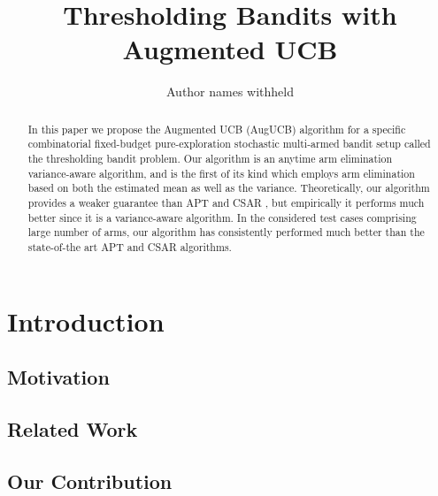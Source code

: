 \documentclass{article}
\title{Thresholding Bandits with Augmented UCB}
\author{Author names withheld}
\begin{document}
\maketitle

\begin{abstract}
In this paper we propose the  Augmented UCB (AugUCB) algorithm for a specific combinatorial fixed-budget pure-exploration stochastic multi-armed bandit setup called the thresholding bandit problem. Our algorithm is an anytime arm elimination variance-aware algorithm, and is the first of its kind which employs arm elimination based on both the estimated mean as well as the variance. 
Theoretically, our algorithm provides a weaker guarantee than APT \cite{locatelli2016optimal} and CSAR \cite{chen2014combinatorial}, but empirically it performs much better since it is a variance-aware algorithm. In the considered test cases comprising large number of arms, our algorithm has consistently performed much better than the state-of-the art APT and CSAR algorithms.  
\end{abstract}


\section{Introduction}
\label{intro}


\subsection{Motivation}
\label{motivation}


\subsection{Related Work}
\label{prevRes}


\subsection{Our Contribution}
\label{contribution}


%
\end{document}
